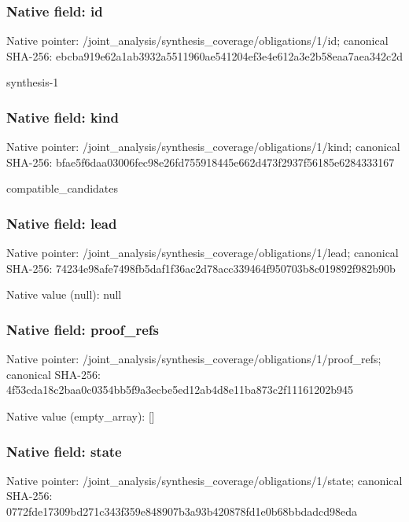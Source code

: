 \documentclass[10pt,a4paper]{article}
\begin{document}
\subsubsection{Native field: id}
Native pointer: /joint\_\allowbreak{}analysis/synthesis\_\allowbreak{}coverage/obligations/1/id; canonical SHA-256: ebcba919e62a1ab3932a5511960ae541204ef3e4e612a3e2b58eaa7aea342c2d

\begingroup\raggedright\sloppy synthesis-1\par\endgroup

\subsubsection{Native field: kind}
Native pointer: /joint\_\allowbreak{}analysis/synthesis\_\allowbreak{}coverage/obligations/1/kind; canonical SHA-256: bfae5f6daa03006fec98e26fd755918445e662d473f2937f56185e6284333167

\begingroup\raggedright\sloppy compatible\_\allowbreak{}candidates\par\endgroup

\subsubsection{Native field: lead}
Native pointer: /joint\_\allowbreak{}analysis/synthesis\_\allowbreak{}coverage/obligations/1/lead; canonical SHA-256: 74234e98afe7498fb5daf1f36ac2d78acc339464f950703b8c019892f982b90b

Native value (null): null

\subsubsection{Native field: proof\_\allowbreak{}refs}
Native pointer: /joint\_\allowbreak{}analysis/synthesis\_\allowbreak{}coverage/obligations/1/proof\_\allowbreak{}refs; canonical SHA-256: 4f53cda18c2baa0c0354bb5f9a3ecbe5ed12ab4d8e11ba873c2f11161202b945

Native value (empty\_\allowbreak{}array): []

\subsubsection{Native field: state}
Native pointer: /joint\_\allowbreak{}analysis/synthesis\_\allowbreak{}coverage/obligations/1/state; canonical SHA-256: 0772fde17309bd271c343f359e848907b3a93b420878fd1e0b68bbdadcd98eda
\end{document}
